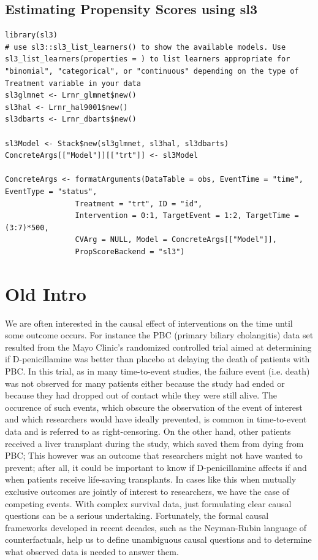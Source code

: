 \documentclass{report}
\newcommand{\1}{\ensuremath{\mathbf{1}}}
\begin{document}
\subsection{Estimating Propensity Scores using sl3}
\label{sec:org63ec9a8}

\begin{lstlisting}
library(sl3)
# use sl3::sl3_list_learners() to show the available models. Use sl3_list_learners(properties = ) to list learners appropriate for "binomial", "categorical", or "continuous" depending on the type of Treatment variable in your data
sl3glmnet <- Lrnr_glmnet$new()
sl3hal <- Lrnr_hal9001$new()
sl3dbarts <- Lrnr_dbarts$new()

sl3Model <- Stack$new(sl3glmnet, sl3hal, sl3dbarts)
ConcreteArgs[["Model"]][["trt"]] <- sl3Model

ConcreteArgs <- formatArguments(DataTable = obs, EventTime = "time", EventType = "status", 
				Treatment = "trt", ID = "id", 
				Intervention = 0:1, TargetEvent = 1:2, TargetTime = (3:7)*500, 
				CVArg = NULL, Model = ConcreteArgs[["Model"]], 
				PropScoreBackend = "sl3")
\end{lstlisting}


\section{Old Intro}
\label{sec:org8fb31fa}

We are often interested in the causal effect of interventions on the time until some outcome occurs. For instance the PBC (primary biliary cholangitis) data set resulted from the Mayo Clinic's randomized controlled trial aimed at determining if D-penicillamine was better than placebo at delaying the death of patients with PBC. In this trial, as in many time-to-event studies, the failure event (i.e. death) was not observed for many patients either because the study had ended or because they had dropped out of contact while they were still alive. The occurence of such events, which obscure the observation of the event of interest and which researchers would have ideally prevented, is common in time-to-event data and is referred to as right-censoring. On the other hand, other patients received a liver transplant during the study, which saved them from dying from PBC; This however was an outcome that researchers might not have wanted to prevent; after all, it could be important to know if D-penicillamine affects if and when patients receive life-saving transplants. In cases like this when mutually exclusive outcomes are jointly of interest to researchers, we have the case of competing events. With complex survival data, just formulating clear causal questions can be a serious undertaking. Fortunately, the formal causal frameworks developed in recent decades, such as the Neyman-Rubin language of counterfactuals, help us to define unambiguous causal questions and to determine what observed data is needed to answer them. 
\end{document}
